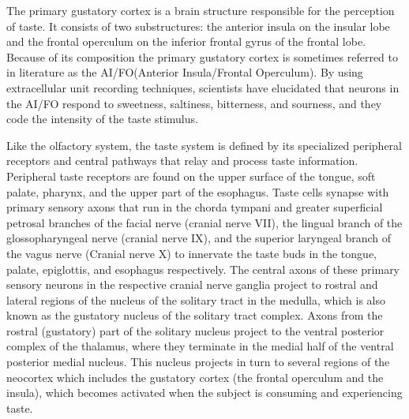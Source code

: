 The primary gustatory cortex is a brain structure responsible for the perception of taste. It consists of two substructures: the anterior insula on the insular lobe and the frontal operculum on the inferior frontal gyrus of the frontal lobe. Because of its composition the primary gustatory cortex is sometimes referred to in literature as the AI/FO(Anterior Insula/Frontal Operculum). By using extracellular unit recording techniques, scientists have elucidated that neurons in the AI/FO respond to sweetness, saltiness, bitterness, and sourness, and they code the intensity of the taste stimulus.

Like the olfactory system, the taste system is defined by its specialized peripheral receptors and central pathways that relay and process taste information. Peripheral taste receptors are found on the upper surface of the tongue, soft palate, pharynx, and the upper part of the esophagus. Taste cells synapse with primary sensory axons that run in the chorda tympani and greater superficial petrosal branches of the facial nerve (cranial nerve VII), the lingual branch of the glossopharyngeal nerve (cranial nerve IX), and the superior laryngeal branch of the vagus nerve (Cranial nerve X) to innervate the taste buds in the tongue, palate, epiglottis, and esophagus respectively. The central axons of these primary sensory neurons in the respective cranial nerve ganglia project to rostral and lateral regions of the nucleus of the solitary tract in the medulla, which is also known as the gustatory nucleus of the solitary tract complex. Axons from the rostral (gustatory) part of the solitary nucleus project to the ventral posterior complex of the thalamus, where they terminate in the medial half of the ventral posterior medial nucleus. This nucleus projects in turn to several regions of the neocortex which includes the gustatory cortex (the frontal operculum and the insula), which becomes activated when the subject is consuming and experiencing taste.

